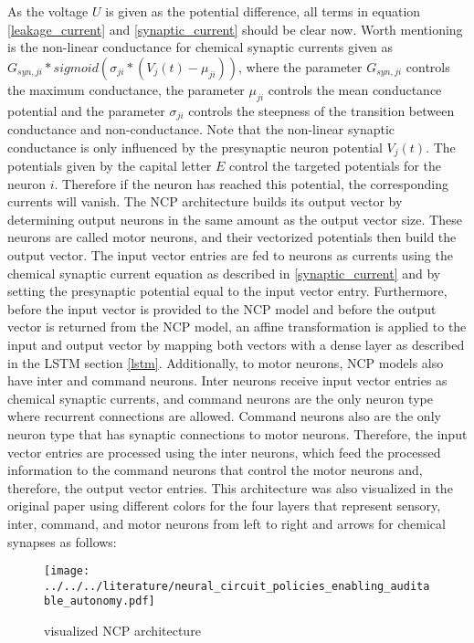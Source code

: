 \documentclass[draft,final]{vutinfth} %
\begin{document}
    As the voltage $U$ is given as the potential difference, all terms in equation \ref{leakage_current} and \ref{synaptic_current} should be clear now.
    Worth mentioning is the non-linear conductance for chemical synaptic currents given as $G_{syn,ji} * sigmoid(\sigma_{ji}*(V_j(t)-\mu_{ji}))$, where the parameter $G_{syn,ji}$ controls the maximum conductance, the parameter $\mu_{ji}$ controls the mean conductance potential and the parameter $\sigma_{ji}$ controls the steepness of the transition between conductance and non-conductance.
    Note that the non-linear synaptic conductance is only influenced by the presynaptic neuron potential $V_j(t)$.
    The potentials given by the capital letter $E$ control the targeted potentials for the neuron $i$. Therefore if the neuron has reached this potential, the corresponding currents will vanish. 
    The NCP architecture builds its output vector by determining output neurons in the same amount as the output vector size.
    These neurons are called motor neurons, and their vectorized potentials then build the output vector.
    The input vector entries are fed to neurons as currents using the chemical synaptic current equation as described in \ref{synaptic_current} and by setting the presynaptic potential equal to the input vector entry.
    Furthermore, before the input vector is provided to the NCP model and before the output vector is returned from the NCP model, an affine transformation is applied to the input and output vector by mapping both vectors with a dense layer as described in the LSTM section \ref{lstm}.
    Additionally, to motor neurons, NCP models also have inter and command neurons.
    Inter neurons receive input vector entries as chemical synaptic currents, and command neurons are the only neuron type where recurrent connections are allowed.
    Command neurons also are the only neuron type that has synaptic connections to motor neurons.
    Therefore, the input vector entries are processed using the inter neurons, which feed the processed information to the command neurons that control the motor neurons and, therefore, the output vector entries.
    This architecture was also visualized in the original paper using different colors for the four layers that represent sensory, inter, command, and motor neurons from left to right and arrows for chemical synapses as follows:
    \begin{figure}[H]
        \centering{}
        \texttt{[image: ../../../literature/neural\_circuit\_policies\_enabling\_auditable\_autonomy.pdf]}
        \caption{visualized NCP architecture \cite[p. 3]{NCP}}
        \label{fig:ncp_vis}
    \end{figure}
\end{document}
